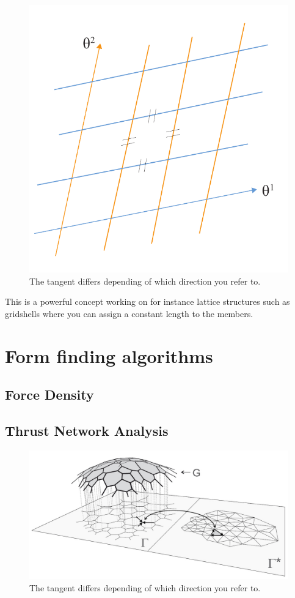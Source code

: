\begin{figure}[H]
\centering
\includegraphics[width=0.6\linewidth ]{figure/Theory/equalMeshFrei.pdf}
\caption{The tangent differs depending of which direction you refer to. }
\end{figure}

This is a powerful concept working on for instance lattice structures such as gridshells where you can assign a constant length to the members.


\section{Form finding algorithms}

\subsection{Force Density}

\subsection{Thrust Network Analysis}

\begin{figure}[H]
\centering
\includegraphics[width=0.6\linewidth ]{figure/Theory/TNA.jpg}
\caption{The tangent differs depending of which direction you refer to. }
\end{figure}


